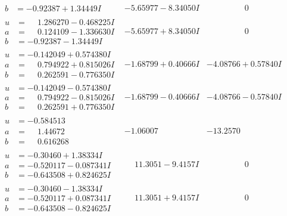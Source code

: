\documentclass[1p]{elsarticle_modified}
\theoremstyle{definition}
\begin{document}
$$\begin{array}{c|c|c}
\begin{aligned}
b &= -0.92387 + 1.34449 I\end{aligned}
 & -5.65977 - 8.34050 I & \phantom{-0.000000 } 0 \\ \hline\begin{aligned}
u &= \phantom{-}1.286270 - 0.468225 I \\
a &= \phantom{-}0.124109 - 1.336630 I \\
b &= -0.92387 - 1.34449 I\end{aligned}
 & -5.65977 + 8.34050 I & \phantom{-0.000000 } 0 \\ \hline\begin{aligned}
u &= -0.142049 + 0.574380 I \\
a &= \phantom{-}0.794922 + 0.815026 I \\
b &= \phantom{-}0.262591 - 0.776350 I\end{aligned}
 & -1.68799 + 0.40666 I & -4.08766 + 0.57840 I \\ \hline\begin{aligned}
u &= -0.142049 - 0.574380 I \\
a &= \phantom{-}0.794922 - 0.815026 I \\
b &= \phantom{-}0.262591 + 0.776350 I\end{aligned}
 & -1.68799 - 0.40666 I & -4.08766 - 0.57840 I \\ \hline\begin{aligned}
u &= -0.584513\phantom{ +0.000000I} \\
a &= \phantom{-}1.44672\phantom{ +0.000000I} \\
b &= \phantom{-}0.616268\phantom{ +0.000000I}\end{aligned}
 & -1.06007\phantom{ +0.000000I} & -13.2570\phantom{ +0.000000I} \\ \hline\begin{aligned}
u &= -0.30460 + 1.38334 I \\
a &= -0.520117 - 0.087341 I \\
b &= -0.643508 + 0.824625 I\end{aligned}
 & \phantom{-}11.3051 - 9.4157 I & \phantom{-0.000000 } 0 \\ \hline\begin{aligned}
u &= -0.30460 - 1.38334 I \\
a &= -0.520117 + 0.087341 I \\
b &= -0.643508 - 0.824625 I\end{aligned}
 & \phantom{-}11.3051 + 9.4157 I & \phantom{-0.000000 } 0 \\ \hline\begin{aligned}

\end{aligned}
\end{array}$$
\end{document}

